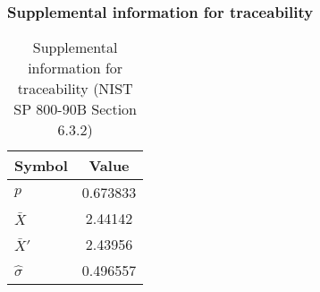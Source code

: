 \documentclass[a3paper,xelatex,english]{bxjsarticle}
\begin{document}
\subsubsection{Supplemental information for traceability}
\renewcommand{\arraystretch}{1.8}
\begin{table}[h]
\caption{Supplemental information for traceability (NIST SP 800-90B Section 6.3.2)}
\begin{center}
\begin{tabular}{|l|c|}
\hline 
\rowcolor{anotherlightblue} %
Symbol				& Value \\ \hline 
$p$				& 0.673833\\ \hline 
$\bar{X}$ 		&  2.44142\\ \hline
$\bar{X}'$		&  2.43956\\ \hline
$\hat{\sigma}$		& 0.496557\\ \hline
\end{tabular}
\end{center}
\end{table}
\renewcommand{\arraystretch}{1.4}
\clearpage
\end{document}
